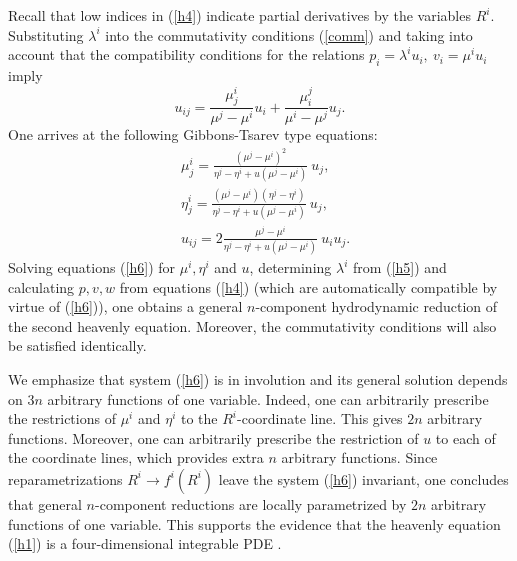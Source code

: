 \documentclass[12pt, a4paper]{article}
\theoremstyle{definition}
\begin{document}
Recall that low indices in (\ref{h4}) indicate partial derivatives by the variables $R^i$. Substituting  $\lambda^i$ into the commutativity conditions (\ref{comm})
and taking into account that the compatibility conditions for the relations $ p_i=\lambda^i u_i, \  v_i=\mu^i u_i$ imply
$$
u_{ij}=\frac{\mu_j^i}{\mu^j-\mu^i}u_i+\frac{\mu_i^j}{\mu^i-\mu^j}u_j.
$$
One arrives at the following Gibbons-Tsarev type equations:
\begin{equation}
\begin{split}
& \mu_j^i=\frac{(\mu^j-\mu^i)^2}{\eta^j-\eta^i+u(\mu^j-\mu^i)} \ u_j, \\
& \eta^i_j=\frac{(\mu^j-\mu^i)(\eta^j-\eta^i)}{\eta^j-\eta^i+u(\mu^j-\mu^i)} \ u_j, \\
& u_{ij}=2\frac{\mu^j-\mu^i}{\eta^j-\eta^i+u(\mu^j-\mu^i)} \ u_iu_j.
\end{split}
\label{h6}
\end{equation}
Solving  equations (\ref{h6}) for $\mu^i,  \eta^i$ and $u$, determining $\lambda^i$ from (\ref{h5}) and calculating $p, v, w$ from  equations (\ref{h4}) 
(which are automatically compatible by virtue of (\ref{h6})), one obtains a general $n$-component hydrodynamic reduction of the second heavenly equation.
Moreover, the commutativity conditions  will also be satisfied identically.



We emphasize that  system (\ref{h6}) is in involution and its general solution depends on $3n$ arbitrary functions of one variable.
Indeed, one can arbitrarily prescribe the restrictions of $\mu^i$ and $\eta^i$ to the $R^i$-coordinate line. This  gives $2n$ arbitrary functions. Moreover, one can arbitrarily 
prescribe the restriction of $u$ to each of the coordinate lines, which provides extra $n$  arbitrary functions. Since  reparametrizations 
$R^i\to f^i(R^i)$ leave the system (\ref{h6}) invariant, one concludes that  general $n$-component reductions are locally parametrized by $2n$ arbitrary functions of one variable. This supports the evidence that the heavenly equation (\ref{h1}) is a  four-dimensional integrable PDE \cite{ferapontov2004integrability}.
\end{document}
